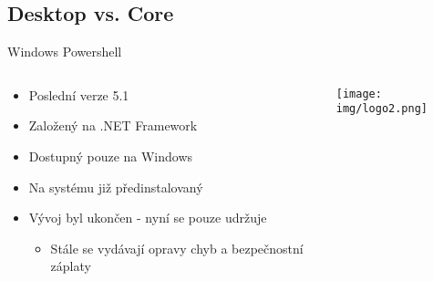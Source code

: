 \documentclass[main.tex]{subfiles}
\begin{document}
\subsection{Desktop vs. Core}
\begin{frame}{Windows Powershell}
  \begin{columns}
    \begin{column}{0.5\textwidth}
      \begin{itemize}
        \item Poslední verze 5.1
        \item Založený na .NET Framework
        \item Dostupný pouze na Windows
        \item Na systému již předinstalovaný
        \item Vývoj byl ukončen - nyní se pouze udržuje
          \begin{itemize}
            \item Stále se vydávají opravy chyb a bezpečnostní záplaty
          \end{itemize}
      \end{itemize}
    \end{column}
    \begin{column}{0.5\textwidth}
      \begin{center}
      \texttt{[image: img/logo2.png]}
      \end{center}
    \end{column}
  \end{columns}
    \end{frame}
\end{document}
